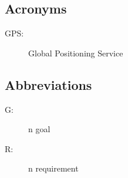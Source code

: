 \documentclass[../../DD.tex]{subfiles}
\begin{document}
		\subsection{Acronyms}
		\begin{description}
		\item[GPS:]Global Positioning Service
		\end{description}
		\subsection{Abbreviations}
		\begin{description}
			 \item[G:]n goal
			 \item[R:]n requirement
			
		\end{description}
		
\end{document}
